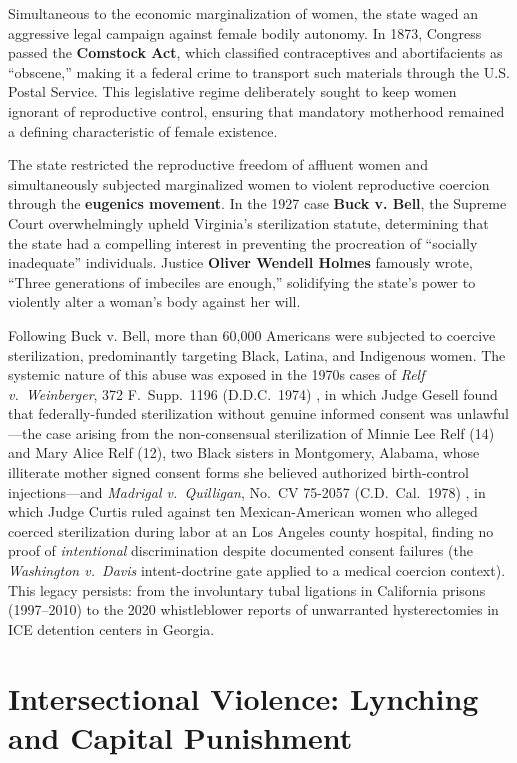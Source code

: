 Simultaneous to the economic marginalization of women, the state waged an aggressive legal campaign against female bodily autonomy. In 1873, Congress passed the \textbf{Comstock Act}, which classified contraceptives and abortifacients as ``obscene,'' making it a federal crime to transport such materials through the U.S. Postal Service. This legislative regime deliberately sought to keep women ignorant of reproductive control, ensuring that mandatory motherhood remained a defining characteristic of female existence. 

The state restricted the reproductive freedom of affluent women and simultaneously subjected marginalized women to violent reproductive coercion through the \textbf{eugenics movement}. In the 1927 case \textbf{Buck v. Bell}, the Supreme Court overwhelmingly upheld Virginia’s sterilization statute, determining that the state had a compelling interest in preventing the procreation of ``socially inadequate'' individuals. Justice \textbf{Oliver Wendell Holmes} famously wrote, ``Three generations of imbeciles are enough,'' solidifying the state's power to violently alter a woman's body against her will.

Following Buck v. Bell, more than 60,000 Americans were subjected to coercive sterilization, predominantly targeting Black, Latina, and Indigenous women. The systemic nature of this abuse was exposed in the 1970s cases of \textit{Relf v.\ Weinberger}, 372 F.\ Supp.\ 1196 (D.D.C.\ 1974) \cite{relf_v_weinberger}, in which Judge Gesell found that federally-funded sterilization without genuine informed consent was unlawful---the case arising from the non-consensual sterilization of Minnie Lee Relf (14) and Mary Alice Relf (12), two Black sisters in Montgomery, Alabama, whose illiterate mother signed consent forms she believed authorized birth-control injections---and \textit{Madrigal v.\ Quilligan}, No.\ CV 75-2057 (C.D.\ Cal.\ 1978) \cite{madrigal_v_quilligan}, in which Judge Curtis ruled against ten Mexican-American women who alleged coerced sterilization during labor at an Los Angeles county hospital, finding no proof of \textit{intentional} discrimination despite documented consent failures (the \textit{Washington v.\ Davis} intent-doctrine gate applied to a medical coercion context). This legacy persists: from the involuntary tubal ligations in California prisons (1997--2010) to the 2020 whistleblower reports of unwarranted hysterectomies in ICE detention centers in Georgia.

\section{Intersectional Violence: Lynching and Capital Punishment}

